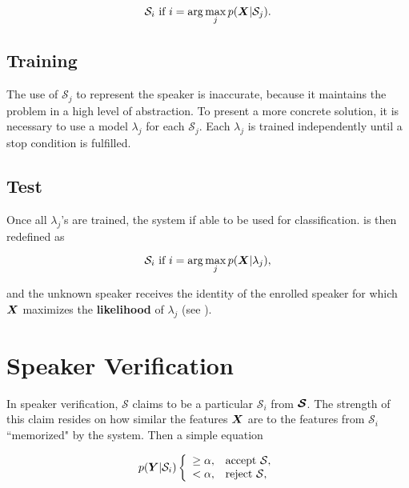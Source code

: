 \begin{equation}
    \mathcal{S}_i \text{ if } i = \arg\max_j \postpdf{\dvec{X}}{\mathcal{S}_j}.
    \label{eq:decision_speaker_identification_2}
\end{equation}

\subsection{Training}

The use of $\mathcal{S}_j$ to represent the speaker is inaccurate, because it maintains the problem in a high level of abstraction. To present a more concrete solution, it is necessary to use a model $\lambda_j$ for each $\mathcal{S}_j$. Each $\lambda_j$ is trained independently until a stop condition is fulfilled.

\subsection{Test}

Once all $\lambda_j$'s are trained, the system if able to be used for classification.  is then redefined as

\begin{equation}
    \mathcal{S}_i \text{ if } i = \arg\max_j \postpdf{\dvec{X}}{\lambda_j},
    \label{eq:decision_speaker_identification_3}
\end{equation}

\noindent and the unknown speaker receives the identity of the enrolled speaker for which $\boldsymbol{X}$ maximizes the \textbf{likelihood} of $\lambda_j$ (see ).

\section{Speaker Verification}

In speaker verification, $\mathcal{S}$ claims to be a particular $\mathcal{S}_i$ from $\boldsymbol{\mathcal{S}}$. The strength of this claim resides on how similar the features $\boldsymbol{X}$ are to the features from $\mathcal{S}_i$ ``memorized" by the system. Then a simple equation

\begin{equation}
    \postpdf{\boldsymbol{Y}}{\mathcal{S}_i} \verifytestB{\alpha}{\mathcal{S}}
    \label{eq:decision_speaker_verification}
\end{equation}

